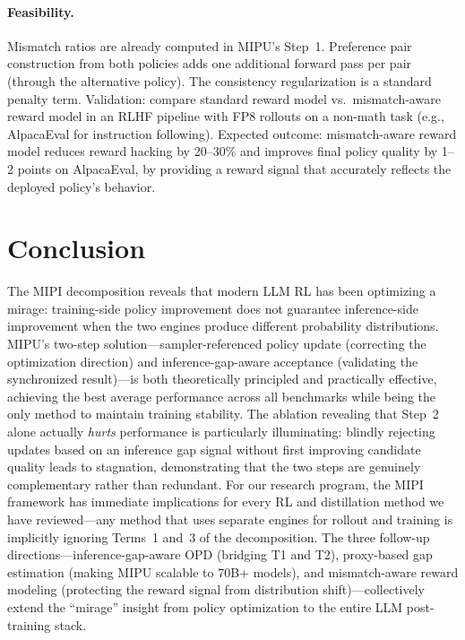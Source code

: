 \documentclass[11pt,a4paper]{article}
\begin{document}
\paragraph{Feasibility.} Mismatch ratios are already computed in MIPU's Step~1. Preference pair construction from both policies adds one additional forward pass per pair (through the alternative policy). The consistency regularization is a standard penalty term. Validation: compare standard reward model vs.\ mismatch-aware reward model in an RLHF pipeline with FP8 rollouts on a non-math task (e.g., AlpacaEval for instruction following). Expected outcome: mismatch-aware reward model reduces reward hacking by 20--30\% and improves final policy quality by 1--2 points on AlpacaEval, by providing a reward signal that accurately reflects the deployed policy's behavior.

\section{Conclusion}

The MIPI decomposition reveals that modern LLM RL has been optimizing a mirage: training-side policy improvement does not guarantee inference-side improvement when the two engines produce different probability distributions. MIPU's two-step solution---sampler-referenced policy update (correcting the optimization direction) and inference-gap-aware acceptance (validating the synchronized result)---is both theoretically principled and practically effective, achieving the best average performance across all benchmarks while being the only method to maintain training stability. The ablation revealing that Step~2 alone actually \emph{hurts} performance is particularly illuminating: blindly rejecting updates based on an inference gap signal without first improving candidate quality leads to stagnation, demonstrating that the two steps are genuinely complementary rather than redundant. For our research program, the MIPI framework has immediate implications for every RL and distillation method we have reviewed---any method that uses separate engines for rollout and training is implicitly ignoring Terms~1 and~3 of the decomposition. The three follow-up directions---inference-gap-aware OPD (bridging T1 and T2), proxy-based gap estimation (making MIPU scalable to 70B+ models), and mismatch-aware reward modeling (protecting the reward signal from distribution shift)---collectively extend the ``mirage'' insight from policy optimization to the entire LLM post-training stack.
\end{document}
